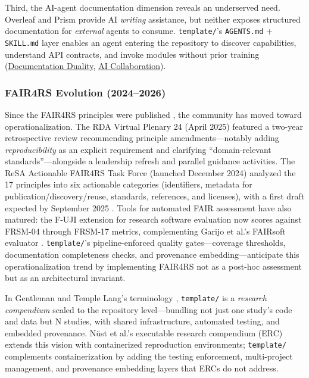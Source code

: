 \documentclass[
]{article}
\begin{document}
Third, the AI-agent documentation dimension reveals an underserved need.
Overleaf and Prism provide AI \emph{writing} assistance, but neither
exposes structured documentation for \emph{external} agents to consume.
\texttt{template/}'s \texttt{AGENTS.md} + \texttt{SKILL.md} layer
enables an agent entering the repository to discover capabilities,
understand API contracts, and invoke modules without prior training
(\href{03c_documentation.md\#documentation-duality-and-ai-collaboration}{Documentation
Duality}, \href{05d_ai_collaboration.md\#the-ai-collaboration-model}{AI
Collaboration}).

\subsubsection{FAIR4RS Evolution
(2024--2026)}\label{fair4rs-evolution-20242026}

Since the FAIR4RS principles were published \citep{barker2022fair4rs},
the community has moved toward operationalization. The RDA Virtual
Plenary 24 (April 2025) featured a two-year retrospective review
\citep{honeyman2024fair4rs} recommending principle amendments---notably
adding \emph{reproducibility} as an explicit requirement and clarifying
``domain-relevant standards''---alongside a leadership refresh and
parallel guidance activities. The ReSA Actionable FAIR4RS Task Force
(launched December 2024) analyzed the 17 principles into six actionable
categories (identifiers, metadata for publication/discovery/reuse,
standards, references, and licenses), with a first draft expected by
September 2025 \citep{resa2024actionable}. Tools for automated FAIR
assessment have also matured: the F-UJI extension for research software
evaluation now scores against FRSM-04 through FRSM-17 metrics,
complementing Garijo et al.'s FAIRsoft evaluator
\citep{garijo2024fairsoft}. \texttt{template/}'s pipeline-enforced
quality gates---coverage thresholds, documentation completeness checks,
and provenance embedding---anticipate this operationalization trend by
implementing FAIR4RS not as a post-hoc assessment but as an
architectural invariant.

In Gentleman and Temple Lang's terminology
\citep{gentleman2007research}, \texttt{template/} is a \emph{research
compendium} scaled to the repository level---bundling not just one
study's code and data but N studies, with shared infrastructure,
automated testing, and embedded provenance. Nüst et al.'s executable
research compendium (ERC) \citep{nust2017containerization} extends this
vision with containerized reproduction environments; \texttt{template/}
complements containerization by adding the testing enforcement,
multi-project management, and provenance embedding layers that ERCs do
not address.
\end{document}
